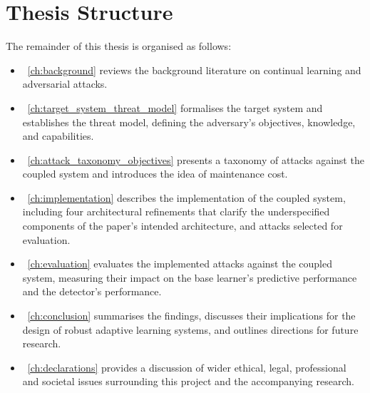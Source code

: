 \section{Thesis Structure}
The remainder of this thesis is organised as follows: 
\begin{itemize}
    \item~\cref{ch:background} reviews the background literature on continual learning and adversarial attacks. 
    
    \item~\cref{ch:target_system_threat_model} formalises the target system and establishes the threat model, defining the adversary's objectives, knowledge, and capabilities.
    
    \item~\cref{ch:attack_taxonomy_objectives} presents a taxonomy of attacks against the coupled system and introduces the idea of maintenance cost. 
    
    \item~\cref{ch:implementation} describes the implementation of the coupled system, including four architectural refinements that clarify the underspecified components of the paper's intended architecture, and attacks selected for evaluation.
    
    \item~\cref{ch:evaluation} evaluates the implemented attacks against the coupled system, measuring their impact on the base learner's predictive performance and the detector's performance.
    
    \item~\cref{ch:conclusion} summarises the findings, discusses their implications for the design of robust adaptive learning systems, and outlines directions for future research.
    
    \item~\cref{ch:declarations} provides a discussion of wider ethical, legal, professional and societal issues surrounding this project and the accompanying research.
\end{itemize}